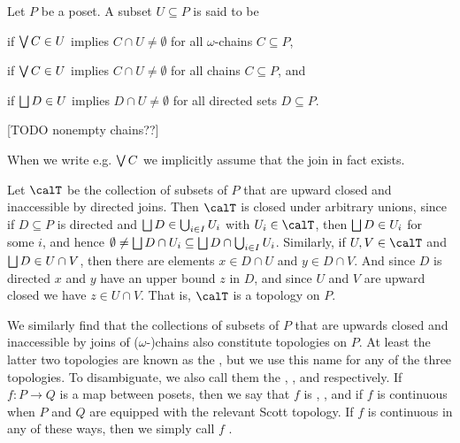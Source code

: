 \documentclass[a4paper, 11pt, article, danish, oneside]{memoir}
\DeclareMathOperator*{\smallbigvee}{\textstyle\bigvee}
\DeclareMathOperator*{\bigjoin}{\mathchoice
    {\smallbigvee}%
    {\bigvee}%
    {\bigvee}%
    {\bigvee}%
}
\DeclareMathOperator*{\smallbigsqcup}{\textstyle\bigsqcup}
\DeclareMathOperator*{\bigdjoin}{\mathchoice
    {\smallbigsqcup}%
    {\bigsqcup}%
    {\bigsqcup}%
    {\bigsqcup}%
}
\newcommand*\intersect\cap
\DeclareMathOperator*{\smallbigcup}{\textstyle\bigcup}
\DeclareMathOperator*{\bigunion}{\mathchoice
    {\smallbigcup}%
    {\bigcup}%
    {\bigcup}%
    {\bigcup}%
}
\begin{document}
\begin{definition}
    Let $P$ be a poset. A subset $U \subseteq P$ is said to be
    \begin{enumdef}
        \item {} if $\bigjoin C \in U$ implies $C \intersect U \neq \emptyset$ for all $\omega$-chains $C \subseteq P$,

        \item {} if $\bigjoin C \in U$ implies $C \intersect U \neq \emptyset$ for all chains $C \subseteq P$, and

        \item {} if $\bigdjoin D \in U$ implies $D \intersect U \neq \emptyset$ for all directed sets $D \subseteq P$.
    \end{enumdef}
    [TODO nonempty chains??]
\end{definition}
%
When we write e.g. $\bigjoin C$ we implicitly assume that the join in fact exists.

Let $\calT$ be the collection of subsets of $P$ that are upward closed and inaccessible by directed joins. Then $\calT$ is closed under arbitrary unions, since if $D \subseteq P$ is directed and $\bigdjoin D \in \bigunion_{i \in I} U_i$ with $U_i \in \calT$, then $\bigdjoin D \in U_i$ for some $i$, and hence $\emptyset \neq \bigdjoin D \intersect U_i \subseteq \bigdjoin D \intersect \bigunion_{i \in I} U_i$. Similarly, if $U,V \in \calT$ and $\bigdjoin D \in U \intersect V$, then there are elements $x \in D \intersect U$ and $y \in D \intersect V$. And since $D$ is directed $x$ and $y$ have an upper bound $z$ in $D$, and since $U$ and $V$ are upward closed we have $z \in U \intersect V$. That is, $\calT$ is a topology on $P$.

We similarly find that the collections of subsets of $P$ that are upwards closed and inaccessible by joins of ($\omega$-)chains also constitute topologies on $P$. At least the latter two topologies are known as the , but we use this name for any of the three topologies. To disambiguate, we also call them the \keyword{$\omega$-}, , and  respectively. If $f \colon P \to Q$ is a map between posets, then we say that $f$ is \keyword{$\omega$-}, , and  if $f$ is continuous when $P$ and $Q$ are equipped with the relevant Scott topology. If $f$ is continuous in any of these ways, then we simply call $f$ .
\end{document}
